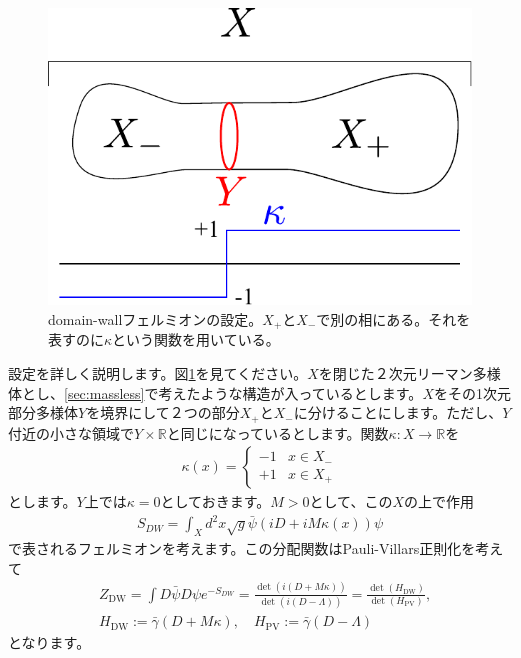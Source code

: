 \documentclass[paper=a4, fontsize=12pt, line_length=16cm, number_of_lines=33,dvipdfmx]{jlreq}
\numberwithin{equation}{section}
\newcommand{\Rb}{\mathbb{R}}
\newcommand{\psib}{\bar{\psi}}
\newcommand{\gammab}{\bar{\gamma}}
\newcommand{\HDW}{H_{\mathrm{DW}}}
\newcommand{\HPV}{H_{\mathrm{PV}}}
\newcommand{\ZDW}{Z_{\mathrm{DW}}}
\begin{document}
\begin{figure}[htbp]
  \centering
  \includegraphics{domainwall.pdf}
  \caption{domain-wallフェルミオンの設定。$X_{+}$と$X_{-}$で別の相にある。それを表すのに$\kappa$という関数を用いている。}
  \label{fig:domainwall}
\end{figure}
設定を詳しく説明します。図\ref{fig:domainwall}を見てください。$X$を閉じた２次元リーマン多様体とし、\ref{sec:massless}で考えたような構造が入っているとします。$X$をその1次元部分多様体$Y$を境界にして２つの部分$X_{+}$と$X_{-}$に分けることにします。ただし、$Y$付近の小さな領域で$Y\times \Rb$と同じになっているとします。関数$\kappa:X\to \Rb$を
\begin{align}
  \kappa(x)=
  \begin{cases}
    -1& x\in X_{-}\\
    +1& x\in X_{+}
  \end{cases}
\end{align}
とします。$Y$上では$\kappa=0$としておきます。$M>0$として、この$X$の上で作用
\begin{align}
  S_{DW}=\int_{X} d^2x\sqrt{g}\psib (iD+iM\kappa(x))\psi
  \label{domainwallaction}
\end{align}
で表されるフェルミオンを考えます。この分配関数はPauli-Villars正則化を考えて
\begin{align}
  &\ZDW=\int D\psib D\psi e^{-S_{DW}}=\frac{\det(i(D+M\kappa))}{\det(i(D-\Lambda))}=\frac{\det(\HDW)}{\det(\HPV)},\nonumber\\
  &\HDW:=\gammab(D+M\kappa),\quad \HPV:=\gammab(D-\Lambda)
  \label{domainwallpartitionfunction}
\end{align}
となります。
\end{document}
